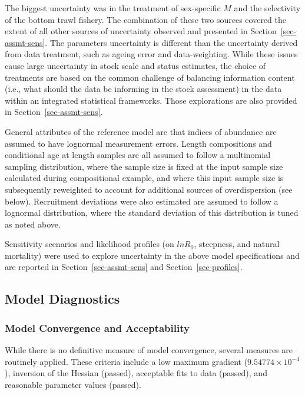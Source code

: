 \documentclass[
]{scrartcl}
\begin{document}
The biggest uncertainty was in the treatment of sex-specific \(M\) and
the selectivity of the bottom trawl fishery. The combination of these
two sources covered the extent of all other sources of uncertainty
observed and presented in Section~\ref{sec-assmt-sens}. The parameters
uncertainty is different than the uncertainty derived from data
treatment, such as ageing error and data-weighting. While these issues
cause large uncertainty in stock scale and status estimates, the choice
of treatments are based on the common challenge of balancing information
content (i.e., what should the data be informing in the stock
assessment) in the data within an integrated statistical frameworks.
Those explorations are also provided in Section~\ref{sec-assmt-sens}.

General attributes of the reference model are that indices of abundance
are assumed to have lognormal measurement errors. Length compositions
and conditional age at length samples are all assumed to follow a
multinomial sampling distribution, where the sample size is fixed at the
input sample size calculated during compositional example, and where
this input sample size is subsequently reweighted to account for
additional sources of overdispersion (see below). Recruitment deviations
were also estimated are assumed to follow a lognormal distribution,
where the standard deviation of this distribution is tuned as noted
above.

Sensitivity scenarios and likelihood profiles (on \(lnR_0\), steepness,
and natural mortality) were used to explore uncertainty in the above
model specifications and are reported in Section~\ref{sec-assmt-sens}
and Section~\ref{sec-profiles}.

\newpage{}

\subsection{Model Diagnostics}\label{model-diagnostics}

\subsubsection{Model Convergence and
Acceptability}\label{sec-model-convergence}

While there is no definitive measure of model convergence, several
measures are routinely applied. These criteria include a low maximum
gradient (\ensuremath{9.54774\times 10^{-4}}), inversion of the Hessian
(passed), acceptable fits to data (passed), and reasonable parameter
values (passed).
\end{document}
